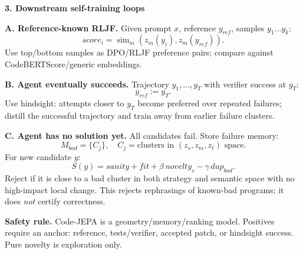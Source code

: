 \documentclass[9pt]{article}
\newcommand{\simfn}{\operatorname{sim}}
\begin{document}
\begin{minipage}[t]{0.325\linewidth}
\textbf{3. Downstream self-training loops}\vspace{0.2em}

\textbf{A. Reference-known RLJF.}
Given prompt $x$, reference $y_{ref}$, samples $y_1\ldots y_k$:
\[
score_i=\simfn_m(z_m(y_i),z_m(y_{ref})).
\]
Use top/bottom samples as DPO/RLJF preference pairs; compare against CodeBERTScore/generic embeddings.

\vspace{0.25em}
\textbf{B. Agent eventually succeeds.}
Trajectory $y_1,\ldots,y_T$ with verifier success at $y_T$:
\[
y_{ref}:=y_T.
\]
Use hindsight: attempts closer to $y_T$ become preferred over repeated failures; distill the successful trajectory and train away from earlier failure clusters.

\vspace{0.25em}
\textbf{C. Agent has no solution yet.}
All candidates fail. Store failure memory:
\[
M_{bad}=\{C_j\},\quad C_j=\text{clusters in }(z_s,z_m,z_\ell)\text{ space}.
\]
For new candidate $y$:
\[
S(y)=sanity+fit+\beta\,novelty_s-\gamma\,dup_{bad}.
\]
Reject if it is close to a bad cluster in both strategy and semantic space with no high-impact local change. This rejects rephrasings of known-bad programs; it does \emph{not} certify correctness.

\vspace{0.25em}
\textbf{Safety rule.} Code-JEPA is a geometry/memory/ranking model. Positives require an anchor: reference, tests/verifier, accepted patch, or hindsight success. Pure novelty is exploration only.
\end{minipage}
\end{document}
